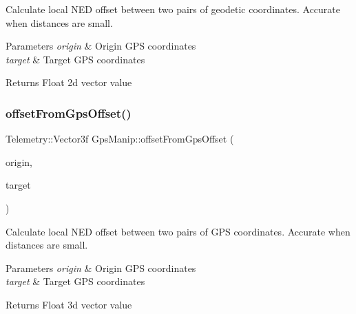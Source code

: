 Calculate local N\+ED offset between two pairs of geodetic coordinates. Accurate when distances are small. 
\begin{DoxyParams}{Parameters}
{\em origin} & Origin G\+PS coordinates \\
\hline
{\em target} & Target G\+PS coordinates \\
\hline
\end{DoxyParams}
\begin{DoxyReturn}{Returns}
Float 2d vector value 
\end{DoxyReturn}
\mbox{\label{class_m210_1_1_gps_manip_aea368ba6b2b436bb46aeece755c4b421}} 
\subsubsection{\texorpdfstring{offset\+From\+Gps\+Offset()}{offsetFromGpsOffset()}\hspace{0.1cm}{\footnotesize\ttfamily [2/2]}}
{\footnotesize\ttfamily Telemetry\+::\+Vector3f Gps\+Manip\+::offset\+From\+Gps\+Offset (\begin{DoxyParamCaption}\item[{const Telemetry\+::\+G\+P\+S\+Fused \&}]{origin,  }\item[{const Telemetry\+::\+G\+P\+S\+Fused \&}]{target }\end{DoxyParamCaption})\hspace{0.3cm}{\ttfamily [static]}}

Calculate local N\+ED offset between two pairs of G\+PS coordinates. Accurate when distances are small. 
\begin{DoxyParams}{Parameters}
{\em origin} & Origin G\+PS coordinates \\
\hline
{\em target} & Target G\+PS coordinates \\
\hline
\end{DoxyParams}
\begin{DoxyReturn}{Returns}
Float 3d vector value 
\end{DoxyReturn}
\mbox{\label{class_m210_1_1_gps_manip_ad3bf0e3449554a4d644316fec52dfa4c}} 
